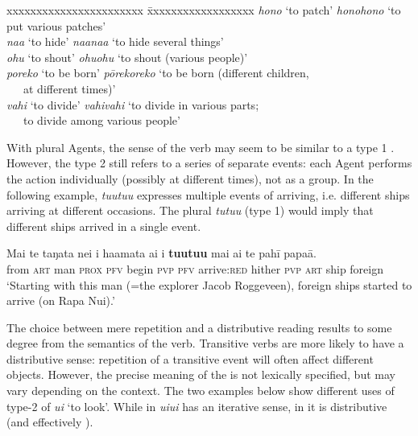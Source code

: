 \ea
\begin{tabbing}
 xxxxxxxxxxxxxxxxxxxxxxx \= xxxxxxxxxxxxxxxxxx\kill
  \textit{hono} ‘to patch’  \>  \textit{honohono} ‘to put various patches’\\
  \textit{na{\ꞌ}a} ‘to hide’  \>  \textit{na{\ꞌ}ana{\ꞌ}a} ‘to hide several things’\\
  \textit{ohu} ‘to shout’  \>  \textit{ohuohu} ‘to shout (various people)’\\
  \textit{poreko} ‘to be born’  \>  \textit{pōrekoreko} ‘to be born (different children, \\
 \> ~~~at different times)’\\
  \textit{vahi} ‘to divide’  \>  \textit{vahivahi} ‘to divide in various parts; \\
 \> ~~~to divide among various people’
\end{tabbing}
\z 
With plural Agents, the sense of the verb may seem to be similar to a type 1 . However, the type 2  still refers to a series of separate events: each Agent performs the action individually (possibly at different times), not as a group. In the following example, \textit{tu{\ꞌ}utu{\ꞌ}u} expresses multiple events of arriving, i.e. different ships arriving at different occasions. The plural \textit{tutu{\ꞌ}u} (type 1) would imply that different ships arrived in a single event.

\ea\label{ex:2.21}
\gll Mai te taŋata nei i ha{\ꞌ}amata ai i \textbf{tu{\ꞌ}utu{\ꞌ}u} mai ai te pahī papa{\ꞌ}ā. \\
from \textsc{art} man \textsc{prox} \textsc{pfv} begin \textsc{pvp} \textsc{pfv} arrive:\textsc{red} hither \textsc{pvp} \textsc{art} ship foreign \\

\glt 
‘Starting with this man (=the explorer Jacob Roggeveen), foreign ships started to arrive (on Rapa Nui).’ \textstyleExampleref{[R111.014]} 
\z

The choice between mere repetition and a distributive reading results to some degree from the semantics of the verb. Transitive verbs are more likely to have a distributive sense: repetition of a transitive event will often affect different objects. However, the precise meaning of the  is not lexically specified, but may vary depending on the context. The two examples below show different uses of type-2  of \textit{u{\ꞌ}i} ‘to look’. While in  \textit{u{\ꞌ}iu{\ꞌ}i} has an iterative sense, in  it is distributive (and effectively ).

